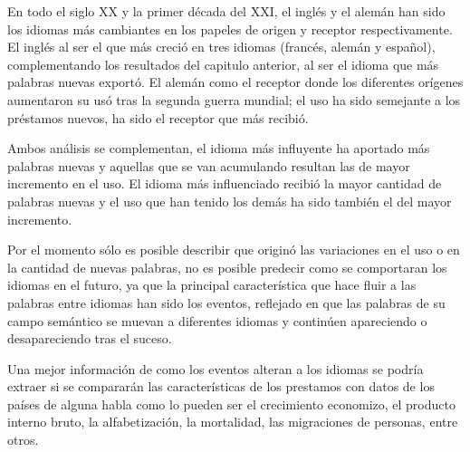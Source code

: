 En todo el siglo XX y la primer década del XXI, el inglés y el alemán han sido los idiomas más cambiantes en los papeles de origen y receptor respectivamente.
El inglés al ser el que más creció en tres idiomas (francés, alemán y español), complementando los resultados del capitulo anterior, al ser el idioma que más palabras nuevas exportó.  El alemán como el receptor donde los diferentes orígenes aumentaron su usó tras la segunda guerra mundial; el uso ha sido semejante a los préstamos nuevos, ha sido el receptor que más recibió. 

Ambos análisis se complementan,  el idioma más influyente ha aportado más palabras nuevas y aquellas que se van acumulando resultan las de mayor incremento en el uso. El idioma más influenciado recibió la mayor cantidad de palabras nuevas y el uso que han tenido los demás ha sido también el del mayor incremento. 

Por el momento sólo es posible describir que originó las variaciones en el uso o en la cantidad de nuevas palabras, no es posible predecir como se comportaran los idiomas en el futuro, ya que la principal característica que  hace fluir a las palabras entre idiomas han sido los eventos, reflejado en que las palabras de su campo semántico  se muevan a diferentes idiomas y continúen apareciendo o desapareciendo tras el suceso. 

Una mejor información de como los eventos alteran a los idiomas se podría extraer si se compararán las características de los prestamos con  datos de los países de alguna habla como lo pueden ser  el crecimiento economizo, el producto interno bruto, la alfabetización, la mortalidad, las migraciones de personas, entre otros.








